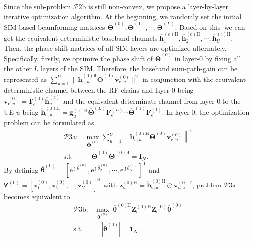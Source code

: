 \documentclass[lettersize,journal]{IEEEtran}
\theoremstyle{remark}
\begin{document}
Since the sub-problem $\mathcal{P}\mathrm{2b}$ is still non-convex, we propose a layer-by-layer iterative optimization algorithm. At the beginning, we randomly set the initial SIM-based beamforming matrices $\overline{\mathbf{\Theta}}^{(0)},
\overline{\mathbf{\Theta}}^{(1)},\cdots,\overline{\mathbf{\Theta}}^{(L)}$. Based on this, we can get the equivalent deterministic baseband channels $\overline{\mathbf{h}}_1^{(\mathrm{c})\mathrm{H}},\overline{\mathbf{h}}_2^{(\mathrm{c})\mathrm{H}},
\cdots,\overline{\mathbf{h}}_U^{(\mathrm{c})\mathrm{H}}$. Then, the phase shift matrices of all SIM layers are optimized alternately. Specifically, firstly, we optimize the phase shift of $\overline{\mathbf{\Theta}}^{(0)}$ in layer-0 by fixing all the other $L$ layers of the SIM. Therefore, the baseband sum-path-gain can be represented as $\sum_{u=1}^{U}\|\ddot{\mathbf{h}}_{\mathrm{c},u}^{(0)\mathrm{H}}
\overline{\mathbf{\Theta}}^{(0)}\ddot{\mathbf{v}}_{\mathrm{c},u}^{(0)}\|^2$ in conjunction with the equivalent deterministic channel between the RF chains and
layer-0 being $\ddot{\mathbf{v}}_{\mathrm{c},u}^{(0)}
=\mathbf{F}_\mathrm{c}^{(0)}\overline{\mathbf{h}}_u^{(\mathrm{c})}$
and the equivalent determinate channel from layer-0 to the UE-$u$ being $\ddot{\mathbf{h}}_{\mathrm{c},u}^{(0)\mathrm{H}}
=\mathbf{g}_u^{(\mathrm{c})\mathrm{H}}\overline{\mathbf{\Theta}}^{(L)}
\mathbf{F}_\mathrm{c}^{(L)}\cdots\overline{\mathbf{\Theta}}^{(1)}\mathbf{F}_\mathrm{c}^{(1)}$. In layer-0, the optimization problem can be formulated as
\begin{align}\label{Beamforming_Design_holographic_4}
    \mathcal{P}\mathrm{3a}:&\max_{\overline{\mathbf{\Theta}}^{(0)}}
    \sum_{u=1}^{U}\left\|\ddot{\mathbf{h}}_{\mathrm{c},u}^{(0)\mathrm{H}}
    \overline{\mathbf{\Theta}}^{(0)}\ddot{\mathbf{v}}_{\mathrm{c},u}^{(0)}\right\|^2\\
    \text{s.t.}&\quad \overline{\mathbf{\Theta}}^{(0)}
    \overline{\mathbf{\Theta}}^{(0)\mathrm{H}}=\mathbf{I}_N.
\end{align}
By defining $\overline{\boldsymbol{\theta}}^{(0)}=[\mathrm{e}^{\jmath\overline{\theta}_1^{(0)}},
\mathrm{e}^{\jmath\overline{\theta}_2^{(0)}},\cdots,\mathrm{e}^{\jmath\overline{\theta}_N^{(0)}}
]^{\mathrm{T}}$ and $\mathbf{Z}^{(0)}=[\mathbf{z}_1^{(0)},\mathbf{z}_2^{(0)},\cdots,
\mathbf{z}_U^{(0)}]^{\mathrm{H}}$ with $\mathbf{z}_u^{(0)\mathrm{H}}=
\ddot{\mathbf{h}}_{\mathrm{c},u}^{(0)\mathrm{H}}\odot
\ddot{\mathbf{v}}_{\mathrm{c},u}^{(0)\mathrm{T}}$, problem $\mathcal{P}\mathrm{3a}$ becomes equivalent to
\begin{align}\label{Beamforming_Design_holographic_5}
    \mathcal{P}\mathrm{3b}:&\max_{\overline{\boldsymbol{\theta}}^{(0)}}\
    \overline{\boldsymbol{\theta}}^{(0)\mathrm{H}}\mathbf{Z}_{\mathrm{c}}^{(0)\mathrm{H}}
    \mathbf{Z}_{\mathrm{c}}^{(0)}\overline{\boldsymbol{\theta}}^{(0)}\\
    \text{s.t.}&\quad \left|\overline{\boldsymbol{\theta}}^{(0)}\right|=\mathbf{1}_N.
\end{align}
\end{document}
